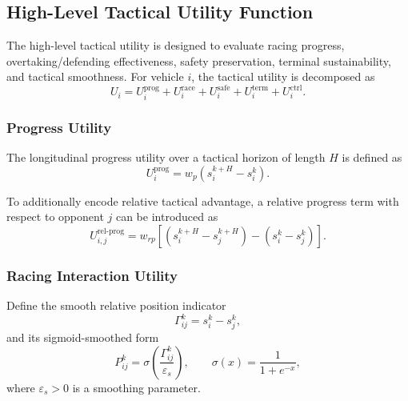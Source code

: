 \documentclass[final ,3p, times]{elsarticle}
\begin{document}
\subsection{High-Level Tactical Utility Function}
\label{subsec:tactical_utility}

The high-level tactical utility is designed to evaluate racing progress, overtaking/defending effectiveness, safety preservation, terminal sustainability, and tactical smoothness. For vehicle $i$, the tactical utility is decomposed as
\begin{equation}
U_i
=
U_i^{\mathrm{prog}}
+
U_i^{\mathrm{race}}
+
U_i^{\mathrm{safe}}
+
U_i^{\mathrm{term}}
+
U_i^{\mathrm{ctrl}}.
\label{eq:utility_decomposition}
\end{equation}

\subsubsection{Progress Utility}

The longitudinal progress utility over a tactical horizon of length $H$ is defined as
\begin{equation}
U_i^{\mathrm{prog}}
=
w_p \left( s_i^{k+H} - s_i^k \right).
\label{eq:progress_utility}
\end{equation}

To additionally encode relative tactical advantage, a relative progress term with respect to opponent $j$ can be introduced as
\begin{equation}
U_{i,j}^{\mathrm{rel\text{-}prog}}
=
w_{rp}
\left[
(s_i^{k+H} - s_j^{k+H}) - (s_i^k - s_j^k)
\right].
\label{eq:relative_progress_utility}
\end{equation}

\subsubsection{Racing Interaction Utility}

Define the smooth relative position indicator
\begin{equation}
\Gamma_{ij}^k = s_i^k - s_j^k,
\label{eq:relative_position_indicator}
\end{equation}
and its sigmoid-smoothed form
\begin{equation}
P_{ij}^k
=
\sigma\!\left( \frac{\Gamma_{ij}^k}{\varepsilon_s} \right),
\qquad
\sigma(x)=\frac{1}{1+e^{-x}},
\label{eq:smooth_position_advantage}
\end{equation}
where $\varepsilon_s>0$ is a smoothing parameter.
\end{document}
